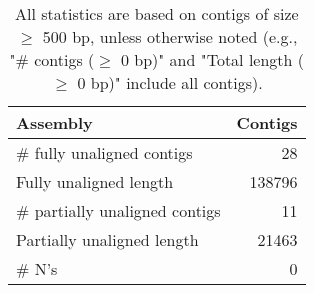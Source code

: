 \documentclass[12pt,a4paper]{article}
\begin{document}
\begin{table}[ht]
\begin{center}
\caption{All statistics are based on contigs of size $\geq$ 500 bp, unless otherwise noted (e.g., "\# contigs ($\geq$ 0 bp)" and "Total length ($\geq$ 0 bp)" include all contigs).}
\begin{tabular}{|l*{1}{|r}|}
\hline
Assembly & Contigs \\ \hline
\# fully unaligned contigs & 28 \\ \hline
Fully unaligned length & 138796 \\ \hline
\# partially unaligned contigs & 11 \\ \hline
Partially unaligned length & 21463 \\ \hline
\# N's & 0 \\ \hline
\end{tabular}
\end{center}
\end{table}
\end{document}

